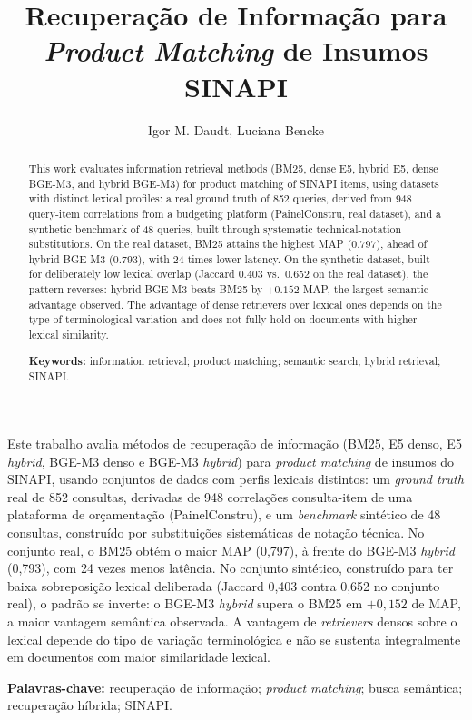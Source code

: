\documentclass[12pt]{article}
\title{Recupera\c{c}\~ao de Informa\c{c}\~ao para \emph{Product Matching} de Insumos SINAPI}
\author{Igor M. Daudt\inst{1}, Luciana Bencke\inst{1}}
\begin{document}
\maketitle

\begin{abstract}
This work evaluates information retrieval methods (BM25, dense E5, hybrid E5, dense BGE-M3, and hybrid BGE-M3) for product matching of SINAPI items, using datasets with distinct lexical profiles: a real ground truth of 852 queries, derived from 948 query-item correlations from a budgeting platform (PainelConstru, real dataset), and a synthetic benchmark of 48 queries, built through systematic technical-notation substitutions. On the real dataset, BM25 attains the highest MAP (0.797), ahead of hybrid BGE-M3 (0.793), with 24 times lower latency. On the synthetic dataset, built for deliberately low lexical overlap (Jaccard 0.403 vs.\ 0.652 on the real dataset), the pattern reverses: hybrid BGE-M3 beats BM25 by $+0.152$ MAP, the largest semantic advantage observed. The advantage of dense retrievers over lexical ones depends on the type of terminological variation and does not fully hold on documents with higher lexical similarity.

\smallskip
\noindent\textbf{Keywords:} information retrieval; product matching; semantic search; hybrid retrieval; SINAPI.
\end{abstract}

\begin{resumo}
Este trabalho avalia m\'etodos de recupera\c{c}\~ao de informa\c{c}\~ao (BM25, E5 denso, E5 \emph{hybrid}, BGE-M3 denso e BGE-M3 \emph{hybrid}) para \emph{product matching} de insumos do SINAPI, usando conjuntos de dados com perfis lexicais distintos: um \emph{ground truth} real de 852 consultas, derivadas de 948 correla\c{c}\~oes consulta-item de uma plataforma de or\c{c}amenta\c{c}\~ao (PainelConstru), e um \emph{benchmark} sint\'etico de 48 consultas, constru\'ido por substitui\c{c}\~oes sistem\'aticas de nota\c{c}\~ao t\'ecnica. No conjunto real, o BM25 obt\'em o maior MAP (0,797), \`a frente do BGE-M3 \emph{hybrid} (0,793), com 24 vezes menos lat\^encia. No conjunto sint\'etico, constru\'ido para ter baixa sobreposi\c{c}\~ao lexical deliberada (Jaccard 0,403 contra 0,652 no conjunto real), o padr\~ao se inverte: o BGE-M3 \emph{hybrid} supera o BM25 em $+0{,}152$ de MAP, a maior vantagem sem\^antica observada. A vantagem de \emph{retrievers} densos sobre o lexical depende do tipo de varia\c{c}\~ao terminol\'ogica e n\~ao se sustenta integralmente em documentos com maior similaridade lexical.

\smallskip
\noindent\textbf{Palavras-chave:} recupera\c{c}\~ao de informa\c{c}\~ao; \emph{product matching}; busca sem\^antica; recupera\c{c}\~ao h\'ibrida; SINAPI.
\end{resumo}
\end{document}

